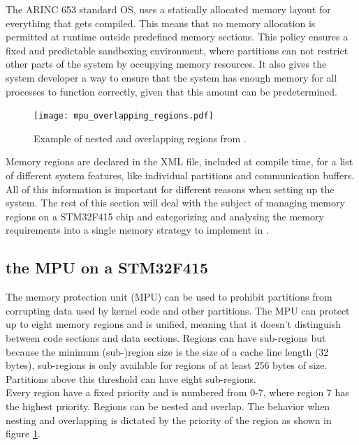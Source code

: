 The ARINC 653 standard OS, uses a statically allocated memory layout for everything that gets compiled.
This means that no memory allocation is permitted at runtime
outside predefined memory sections.
This policy ensures a fixed and predictable sandboxing environment, where partitions can not restrict other parts of the system by occupying memory resources.
It also gives the system developer a way to ensure that the system has enough memory for all processes to function correctly, given that this amount can be predetermined.

\begin{figure}
	\vspace{-20pt}
	\centering
	\texttt{[image: mpu\_overlapping\_regions.pdf]}
	\caption{Example of nested and overlapping regions from \cite{stm32_mpu}.}
	\label{fig:stm32_mpu}
	\vspace{-40pt}
\end{figure}

Memory regions are declared in the XML file, included at compile time, for a list of different system features, like individual partitions and communication buffers.
All of this information is important for different reasons when setting up the system.
The rest of this section will deal with the subject of managing memory regions on a STM32F415 chip and categorizing and analysing the memory requirements into a single memory strategy to implement in .

\subsection{the MPU on a STM32F415}
The memory protection unit (MPU) can be used to prohibit partitions from corrupting data used by kernel code and other partitions.
The MPU can protect up to eight memory regions and is unified, meaning that it doesn't distinguish between code sections and data sections.
Regions can have sub-regions but because the minimum (sub-)region size is the size of a cache line length (32 bytes), sub-regions is only available for regions of at least 256 bytes of size.
Partitions above this threshold can have eight sub-regions.\\

Every region have a fixed priority and is numbered from 0-7, where region 7 has the highest priority.
Regions can be nested and overlap.
The behavior when nesting and overlapping is dictated by the priority of the region as shown in figure \ref{fig:stm32_mpu}.


